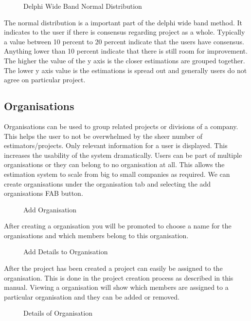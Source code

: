 \begin{itemize}
\begin{figure}[H]
	    	\caption{Delphi Wide Band Normal Distribution}
	    	\label{fig:Delphi Wide Band Normal Distribution}
   	\end{figure}
	The normal distribution is a important part of the delphi wide band method. It indicates to the user if there is consensus regarding project as a whole. Typically a value between 10 percent to 20 percent indicate that the users have consensus. Anything lower than 10 percent indicate that there is still room for improvement. The higher the value of the y axis is the closer estimations are grouped together. The lower y axis value is the estimations is spread out and generally users do not agree on particular project.
\end{itemize}
\subsection{Organisations}
Organisations can be used to group related projects or divisions of a company. This helps the user to not  be overwhelmed by the sheer number of estimators/projects. Only relevant information for a user is displayed. This increases the usability of the system dramatically. Users can be part of multiple organisations or they can belong to no organisation at all. This allows the estimation system to scale from big to small companies as required. We can create organisations under the organisation tab and selecting the add organisations FAB button.
	\begin{figure}[H]
	    	\centering
	    	\caption{Add Organisation}
	    	\label{fig:Add Organisation}
   	\end{figure}
After creating a organisation you will be promoted to choose a name for the organisations and which members belong to this organisation.
	\begin{figure}[H]
	    	\centering
	    	\caption{Add Details to Organisation}
	    	\label{fig:Add Details to Organisation}
   	\end{figure}
After the project has been created a project can easily be assigned to the organisation. This is done in the project creation process as described in this manual.  Viewing a organisation will show which members are assigned to a particular organisation and they can be added or removed. 
	\begin{figure}[H]
	    	\centering
	    	\caption{Details of Organisation}
	    	\label{fig:Details of Organisation}
   	\end{figure}
	
	
	
	
	
	
	
	
	
	
	
	
	
	
	
	
	
	
	
	
	
